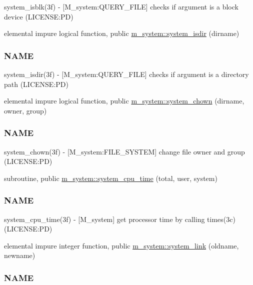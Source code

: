 \begin{DoxyCompactItemize}
\begin{DoxyCompactList}
system\+\_\+isblk(3f) -\/ \mbox{[}M\+\_\+system\+:Q\+U\+E\+R\+Y\+\_\+\+F\+I\+LE\mbox{]} checks if argument is a block device (L\+I\+C\+E\+N\+SE\+:PD) \end{DoxyCompactList}\item 
elemental impure logical function, public \mbox{\hyperlink{namespacem__system_a7946ea976f399baff21caebcbe931f6d}{m\+\_\+system\+::system\+\_\+isdir}} (dirname)
\begin{DoxyCompactList}\small\item\em \subsubsection*{N\+A\+ME}

system\+\_\+isdir(3f) -\/ \mbox{[}M\+\_\+system\+:Q\+U\+E\+R\+Y\+\_\+\+F\+I\+LE\mbox{]} checks if argument is a directory path (L\+I\+C\+E\+N\+SE\+:PD) \end{DoxyCompactList}\item 
elemental impure logical function, public \mbox{\hyperlink{namespacem__system_ab89e4d2fb219225c374570d4f9d58e9b}{m\+\_\+system\+::system\+\_\+chown}} (dirname, owner, group)
\begin{DoxyCompactList}\small\item\em \subsubsection*{N\+A\+ME}

system\+\_\+chown(3f) -\/ \mbox{[}M\+\_\+system\+:F\+I\+L\+E\+\_\+\+S\+Y\+S\+T\+EM\mbox{]} change file owner and group (L\+I\+C\+E\+N\+SE\+:PD) \end{DoxyCompactList}\item 
subroutine, public \mbox{\hyperlink{namespacem__system_a257d2b8987db850bc686507f19ccbe4a}{m\+\_\+system\+::system\+\_\+cpu\+\_\+time}} (total, user, system)
\begin{DoxyCompactList}\small\item\em \subsubsection*{N\+A\+ME}

system\+\_\+cpu\+\_\+time(3f) -\/ \mbox{[}M\+\_\+system\mbox{]} get processor time by calling times(3c) (L\+I\+C\+E\+N\+SE\+:PD) \end{DoxyCompactList}\item 
elemental impure integer function, public \mbox{\hyperlink{namespacem__system_a0e04b5499fc3367eda9758b6e396a103}{m\+\_\+system\+::system\+\_\+link}} (oldname, newname)
\begin{DoxyCompactList}\small\item\em \subsubsection*{N\+A\+ME}


\end{DoxyCompactList}
\end{DoxyCompactItemize}

